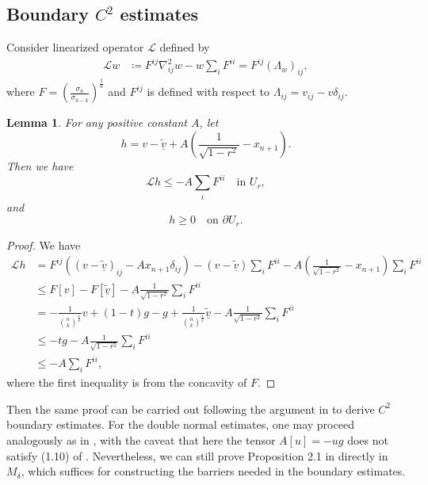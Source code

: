 \documentclass[reqno]{amsart}
\newtheorem{lemma}[theorem]{Lemma}
\theoremstyle{remark}
\theoremstyle{definition}
\numberwithin{equation}{section}
\begin{document}
\subsection{Boundary \texorpdfstring{$C^2$}{C2} estimates}

Consider linearized operator $\mathscr{L}$ defined by
\begin{align*}
    \mathscr{L} w &\coloneqq F^{ij} \nabla^2_{ij}w - w \sum_{i}F^{ii} = F^{ij} (\Lambda_w)_{ij},
\end{align*}
where $F = \left( \frac{\sigma_n}{\sigma_{n-k}} \right)^{\frac{1}{k}}$ and $F^{ij}$ is defined with respect to $\Lambda_{ij}=v_{ij}-v\delta_{ij}$.

\begin{lemma}\label{auxiliary function for boundary estimates}
    For any positive constant $A$, let
    \[
    h = v - \tilde{\underline{v}} + A \left(\frac{1}{\sqrt{1-r^2}} - x_{n+1}\right).
    \]
    Then we have
    \[
    \mathscr{L} h \leqslant -A \sum_{i} F^{ii} \quad \text{in } U_r,
    \]
    and
    \[
    h \geqslant 0 \quad \text{on } \partial U_r.
    \]
\end{lemma}
\begin{proof}
    We have
    \begin{align*}
        \mathscr{L} h &= F^{ij} ((v - \tilde{\underline{v}})_{ij} - A x_{n+1} \delta_{ij}) - (v - \tilde{\underline{v}}) \sum_{i}F^{ii} - A \left(\frac{1}{\sqrt{1-r^2}} - x_{n+1}\right) \sum_{i}F^{ii} \\
        &\leqslant F[v] - F[\tilde{\underline{v}}] - A\frac{1}{\sqrt{1-r^2}} \sum_{i}F^{ii} \\
        &= -\frac{1}{\binom{n}{k}^{\frac{1}{k}}}v + (1-t)g - g + \frac{1}{\binom{n}{k}^{\frac{1}{k}}}\tilde{\underline{v}} - A\frac{1}{\sqrt{1-r^2}}\sum_{i}F^{ii} \\
        &\leqslant -tg - A\frac{1}{\sqrt{1-r^2}} \sum_{i}F^{ii} \\
        &\leqslant -A \sum_{i} F^{ii},
    \end{align*}
    where the first inequality is from the concavity of $F$.
\end{proof}
Then the same proof can be carried out following the argument in \cite{GuanJiao} to derive $C^2$ boundary estimates. For the double normal estimates, one may proceed analogously as in \cite{GuanJiao}, with the caveat that here the tensor $A[u] = -ug$ does not satisfy (1.10) of \cite{GuanJiao}. Nevertheless, we can still prove Proposition 2.1 in \cite{GuanJiao} directly in $M_\delta$, which suffices for constructing the barriers needed in the boundary estimates.
\end{document}
